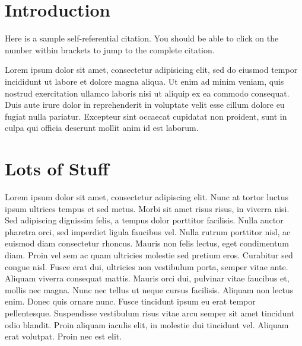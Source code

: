 \documentclass{chi-ext}
\begin{document}
\begin{multicols}{2}
\begin{flushleft}

\section{Introduction}

Here \cite{chi_extended_template} is a sample self-referential citation. You should be able to click
on the number within brackets to jump to the complete citation.

Lorem ipsum dolor sit amet, consectetur adipisicing elit, sed do eiusmod tempor incididunt ut labore
et dolore magna aliqua. Ut enim ad minim veniam, quis nostrud exercitation ullamco laboris nisi ut
aliquip ex ea commodo consequat. Duis aute irure dolor in reprehenderit in voluptate velit esse
cillum dolore eu fugiat nulla pariatur. Excepteur sint occaecat cupidatat non proident, sunt in
culpa qui officia deserunt mollit anim id est laborum.

\section{Lots of Stuff}

Lorem ipsum dolor sit amet, consectetur adipiscing elit. Nunc at tortor luctus ipsum ultrices tempus
et sed metus. Morbi sit amet risus risus, in viverra nisi. Sed adipiscing dignissim felis, a tempus
dolor porttitor facilisis. Nulla auctor pharetra orci, sed imperdiet ligula faucibus vel. Nulla
rutrum porttitor nisl, ac euismod diam consectetur rhoncus. Mauris non felis lectus, eget
condimentum diam. Proin vel sem ac quam ultricies molestie sed pretium eros. Curabitur sed congue
nisl. Fusce erat dui, ultricies non vestibulum porta, semper vitae ante. Aliquam viverra consequat
mattis. Mauris orci dui, pulvinar vitae faucibus et, mollis nec magna. Nunc nec tellus ut neque
cursus facilisis. Aliquam non lectus enim. Donec quis ornare nunc. Fusce tincidunt ipsum eu erat
tempor pellentesque. Suspendisse vestibulum risus vitae arcu semper sit amet tincidunt odio blandit.
Proin aliquam iaculis elit, in molestie dui tincidunt vel. Aliquam erat volutpat. Proin nec est
elit.


\end{flushleft}
\end{multicols}
\end{document}
